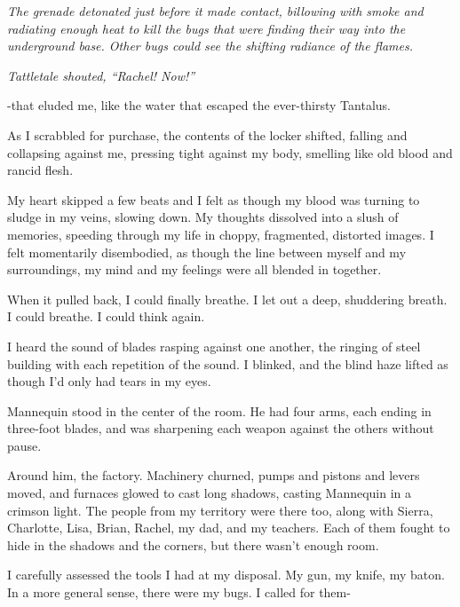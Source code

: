 \emph{The grenade detonated just before it made contact, billowing with smoke and radiating enough heat to kill the bugs that were finding their way into the underground base.  Other bugs could see the shifting radiance of the flames.}



\emph{Tattletale shouted, ``Rachel!  Now!''}



\blacksquare



-that eluded me, like the water that escaped the ever-thirsty Tantalus.



As I scrabbled for purchase, the contents of the locker shifted, falling and collapsing against me, pressing tight against my body, smelling like old blood and rancid flesh.



My heart skipped a few beats and I felt as though my blood was turning to sludge in my veins, slowing down.  My thoughts dissolved into a slush of memories, speeding through my life in choppy, fragmented, distorted images.  I felt momentarily disembodied, as though the line between myself and my surroundings, my mind and my feelings were all blended in together.



When it pulled back, I could finally breathe.  I let out a deep, shuddering breath.  I could breathe.  I could think again.



I heard the sound of blades rasping against one another, the ringing of steel building with each repetition of the sound.  I blinked, and the blind haze lifted as though I'd only had tears in my eyes.



Mannequin stood in the center of the room.  He had four arms, each ending in three-foot blades, and was sharpening each weapon against the others without pause.



Around him, the factory.  Machinery churned, pumps and pistons and levers moved, and furnaces glowed to cast long shadows, casting Mannequin in a crimson light.  The people from my territory were there too, along with Sierra, Charlotte, Lisa, Brian, Rachel, my dad, and my teachers.  Each of them fought to hide in the shadows and the corners, but there wasn't enough room.



I carefully assessed the tools I had at my disposal.  My gun, my knife, my baton.  In a more general sense, there were my bugs.  I called for them-



